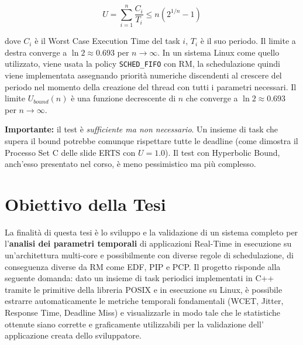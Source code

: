 \begin{equation}
	U = \sum_{i=1}^{n} \frac{C_i}{T_i} \leq n \left(2^{1/n} - 1\right)
	\label{eq:rms_bound}
\end{equation}

dove $C_i$ è il Worst Case Execution Time del task $i$, $T_i$ è il suo periodo. Il limite a destra converge a $\ln 2 \approx 0.693$ per $n \rightarrow \infty$. In un sistema Linux come quello utilizzato, viene usata la policy \texttt{SCHED\_FIFO} con RM, la schedulazione quindi viene implementata assegnando priorità numeriche discendenti al crescere del periodo nel momento della creazione del thread con tutti i parametri necessari.
Il limite $U_{bound}(n)$ è una funzione decrescente di $n$ che converge a $\ln 2 \approx 0.693$ per $n \to \infty$.

\noindent\textbf{Importante:} il test è \textit{sufficiente ma non necessario}. Un insieme di task che supera il bound potrebbe comunque rispettare tutte le deadline (come dimostra il Processo Set C delle slide ERTS con $U = 1.0$). Il test con Hyperbolic Bound, anch'esso presentato nel corso, è meno pessimistico ma più complesso.

\section{Obiettivo della Tesi}
La finalità di questa tesi è lo sviluppo e la validazione di un sistema completo per l'\textbf{analisi dei parametri temporali} di applicazioni Real-Time in esecuzione su un'architettura multi-core e possibilmente con diverse regole di schedulazione, di conseguenza diverse da RM come EDF, PIP e PCP. Il progetto risponde alla seguente domanda: dato un insieme di task periodici implementati in C++ tramite le primitive della libreria  POSIX e in esecuzione su Linux, è possibile estrarre automaticamente le metriche temporali fondamentali (WCET, Jitter, Response Time, Deadline Miss) e visualizzarle in modo tale che le statistiche ottenute siano corrette e graficamente utilizzabili per la validazione dell' applicazione creata dello sviluppatore.

